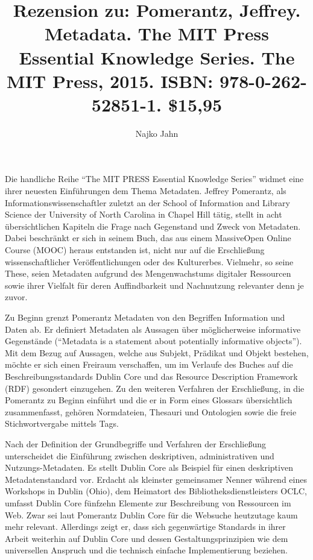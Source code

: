\documentclass[a4paper,
fontsize=11pt,
oneside,
numbers=noperiodatend,
parskip=half-,
bibliography=totoc,
final
]{scrartcl}
\title{\LARGE{Rezension zu: Pomerantz, Jeffrey. Metadata. The MIT Press Essential Knowledge Series. The MIT Press, 2015. ISBN: 978-0-262-52851-1. \$15,95}} %
\author{Najko Jahn} %
\date{}
\begin{document}
\maketitle
\thispagestyle{fancyplain} 


Die handliche Reihe \enquote{The MIT PRESS Essential Knowledge Series}
widmet eine ihrer neuesten Einführungen dem Thema Metadaten. Jeffrey
Pomerantz, als Informationswissenschaftler zuletzt an der School of
Information and Library Science der University of North Carolina in
Chapel Hill tätig, stellt in acht übersichtlichen Kapiteln die Frage
nach Gegenstand und Zweck von Metadaten. Dabei beschränkt er sich in
seinem Buch, das aus einem MassiveOpen Online Course (MOOC) heraus
entstanden ist, nicht nur auf die Erschließung wissenschaftlicher
Veröffentlichungen oder des Kulturerbes. Vielmehr, so seine These, seien
Metadaten aufgrund des Mengenwachstums digitaler Ressourcen sowie ihrer
Vielfalt für deren Auffindbarkeit und Nachnutzung relevanter denn je
zuvor.

Zu Beginn grenzt Pomerantz Metadaten von den Begriffen Information und
Daten ab. Er definiert Metadaten als Aussagen über möglicherweise
informative Gegenstände (\enquote{Metadata is a statement about
potentially informative objects}). Mit dem Bezug auf Aussagen, welche
aus Subjekt, Prädikat und Objekt bestehen, möchte er sich einen Freiraum
verschaffen, um im Verlaufe des Buches auf die Beschreibungsstandards
Dublin Core und das Resource Description Framework (RDF) gesondert
einzugehen. Zu den weiteren Verfahren der Erschließung, in die Pomerantz
zu Beginn einführt und die er in Form eines Glossars übersichtlich
zusammenfasst, gehören Normdateien, Thesauri und Ontologien sowie die
freie Stichwortvergabe mittels Tags.

Nach der Definition der Grundbegriffe und Verfahren der Erschließung
unterscheidet die Einführung zwischen deskriptiven, administrativen und
Nutzungs-Metadaten. Es stellt Dublin Core als Beispiel für einen
deskriptiven Metadatenstandard vor. Erdacht als kleinster gemeinsamer
Nenner während eines Workshops in Dublin (Ohio), dem Heimatort des
Bibliotheksdienstleisters OCLC, umfasst Dublin Core fünfzehn Elemente
zur Beschreibung von Ressourcen im Web. Zwar sei laut Pomerantz Dublin
Core für die Websuche heutzutage kaum mehr relevant. Allerdings zeigt
er, dass sich gegenwärtige Standards in ihrer Arbeit weiterhin auf
Dublin Core und dessen Gestaltungsprinzipien wie dem universellen
Anspruch und die technisch einfache Implementierung beziehen.
\end{document}
